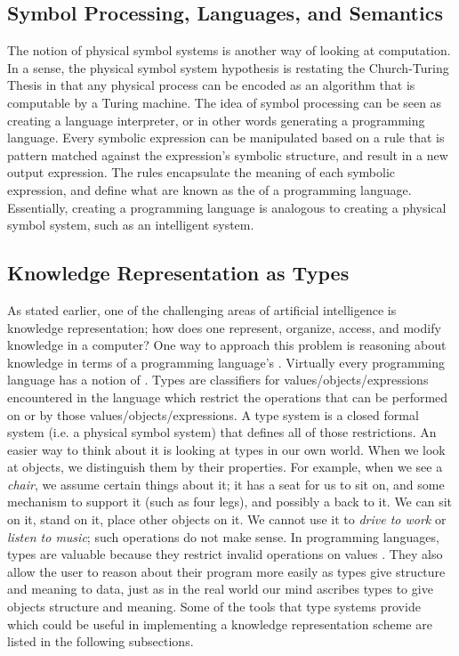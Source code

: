 \subsection{Symbol Processing, Languages, and Semantics}
The notion of physical symbol systems is another way of looking at computation. In a sense, the physical symbol system hypothesis is restating the Church-Turing Thesis in that any physical process can be encoded as an algorithm that is computable by a Turing machine. The idea of symbol processing can be seen as creating a language interpreter, or in other words generating a programming language. Every symbolic expression can be manipulated based on a rule that is pattern matched against the expression's symbolic structure, and result in a new output expression. The rules encapsulate the meaning of each symbolic expression, and define what are known as the  of a programming language. Essentially, creating a programming language is analogous to creating a physical symbol system, such as an intelligent system.

\subsection{Knowledge Representation as Types}
As stated earlier, one of the challenging areas of artificial intelligence is knowledge representation; how does one represent, organize, access, and modify knowledge in a computer? One way to approach this problem is reasoning about knowledge in terms of a programming language's . Virtually every programming language has a notion of . Types are classifiers for values/objects/expressions encountered in the language which restrict the operations that can be performed on or by those values/objects/expressions. A type system is a closed formal system (i.e. a physical symbol system) that defines all of those restrictions. An easier way to think about it is looking at types in our own world. When we look at objects, we distinguish them by their properties. For example, when we see a \textit{chair}, we assume certain things about it; it has a seat for us to sit on, and some mechanism to support it (such as four legs), and possibly a back to it. We can sit on it, stand on it, place other objects on it. We cannot use it to \textit{drive to work} or \textit{listen to music}; such operations do not make sense. In programming languages, types are valuable because they restrict invalid operations on values \citep{pierce:types}. They also allow the user to reason about their program more easily as types give structure and meaning to data, just as in the real world our mind ascribes types to give objects structure and meaning. Some of the tools that type systems provide which could be useful in implementing a knowledge representation scheme are listed in the following subsections.


